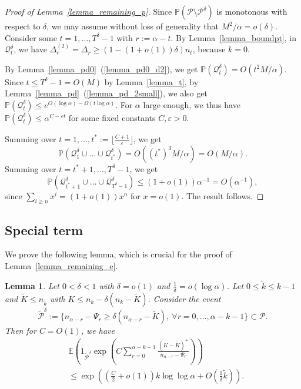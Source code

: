 \documentclass{article}
\theoremstyle{plain}
\theoremstyle{remark}
\theoremstyle{plain}
\newtheorem{lemma}[theorem]{Lemma}
\numberwithin{equation}{section}
\begin{document}
	\begin{proof}[Proof of Lemma~\ref{lemma_remaining_p}]
		Since $\mathbb{P}(\mathcal{P}\setminus\mathcal{P}^{\delta})$ is monotonous with respect to $\delta$, we may assume without loss of generality that $M^2/\alpha=o(\delta)$. Consider some $t=1,\ldots,T^{\delta}-1$ with $r:=\alpha-t$. By Lemma~\ref{lemma_boundpt}, in $\mathcal{Q}_t^{\delta}$, we have $\Delta_r^{(2)}=\Delta_r\geq(1-(1+o(1))\delta)n_t$, because $k=0$.
		
		By Lemma~\ref{lemma_pd0}~(\ref{lemma_pd0_d2}), we get $\mathbb{P}(\mathcal{Q}_t^{\delta})=O(t^2M/\alpha)$. Since $t\leq T^{\delta}-1=O(M)$ by Lemma~\ref{lemma_t}, by Lemma~\ref{lemma_pd}~(\ref{lemma_pd_2small}), we also get $\mathbb{P}(\mathcal{Q}_t^{\delta})\leq e^{O(\log\alpha)-\Omega(t\log\alpha)}$. For $\alpha$ large enough, we thus have $\mathbb{P}(\mathcal{Q}_t^{\delta})\leq\alpha^{C-\varepsilon t}$ for some fixed constants $C,\varepsilon>0$.
		
		Summing over $t=1,\ldots,t^*:=\lfloor\tfrac{C+1}{\varepsilon}\rfloor$, we get $$\mathbb{P}(\mathcal{Q}_1^{\delta}\cup\ldots\cup\mathcal{Q}_{t^*}^{\delta})=O((t^*)^3M/\alpha)=O(M/\alpha).$$ Summing over $t=t^*+1,\ldots,T^{\delta}-1$, we get $$\mathbb{P}(\mathcal{Q}_{t^*+1}^{\delta}\cup\ldots\cup\mathcal{Q}_{T^{\delta}-1}^{\delta})\leq(1+o(1))\alpha^{-1}=O(\alpha^{-1}),$$ since $\sum_{i\geq n}x^i=(1+o(1))x^n$ for $x=o(1)$. The result follows.
	\end{proof}
	
	\subsection{Special term}\label{subsection_proof_further}
	
	We prove the following lemma, which is crucial for the proof of Lemma~\ref{lemma_remaining_e}.
	
	\begin{lemma}\label{lemma_depth}
		Let $0<\delta<1$ with $\delta=o(1)$ and $\tfrac1{\delta}=o(\log\alpha)$. Let $0\leq\widetilde{k}\leq k-1$ and $\widetilde{K}\leq n_{\tilde{k}}$ with $K\leq n_k-\delta(n_k-\widetilde{K})$. Consider the event $$\widetilde{\mathcal{P}}^{\delta}:=\{n_{\alpha-r}-\Psi_r\geq\delta(n_{\alpha-r}-\widetilde{K}),\ \forall r=0,\ldots,\alpha-k-1\}\subset\mathcal{P}.$$ Then for $C=O(1)$, we have
		\begin{align}
			&\mathbb{E}\left(1_{\widetilde{\mathcal{P}}^{\delta}}\exp\left(C\sum_{r=0}^{\alpha-k-1}\frac{(K-\widetilde{K})^+}{n_{\alpha-r}-\Psi_r}\right)\right)
			\\&\leq\exp\left((\tfrac{C}{2}+o(1))k\log\log\alpha+O(\tfrac{1}{\delta}\widetilde{k})\right).
		\end{align}
	\end{lemma}
	
\end{document}
